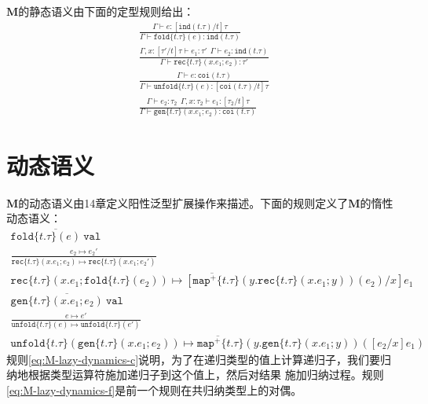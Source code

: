 $\textbf{M}$的静态语义由下面的定型规则给出：
\begin{subequations}\label{eq:M-lazy-statics}
	\begin{gather}
	\frac{\Gamma\vdash e:[\texttt{ind}(t.\tau)/t]\tau}{\Gamma\vdash\texttt{fold}\{t.\tau\}(e):\texttt{ind}(t.\tau)} \\
	\frac{\Gamma,x:[\tau'/t]\tau\vdash e_1:\tau'\ \ \Gamma\vdash e_2:\texttt{ind}(t.\tau)}
	{\Gamma\vdash\texttt{rec}\{t.\tau\}(x.e_1;e_2):\tau'} \\
	\frac{\Gamma\vdash e:\texttt{coi}(t.\tau)}{\Gamma\vdash\texttt{unfold}\{t.\tau\}(e):[\texttt{coi}(t.\tau)/t]\tau} \\
	\frac{\Gamma\vdash e_2:\tau_2\ \ \Gamma,x:\tau_2\vdash e_1:[\tau_2/t]\tau}
	{\Gamma\vdash\texttt{gen}\{t.\tau\}(x.e_1;e_2):\texttt{coi}(t.\tau)}
	\end{gather}
\end{subequations}

\section{动态语义}

$\textbf{M}$的动态语义由14章定义阳性泛型扩展操作来描述。下面的规则定义了$\textbf{M}$的惰性动态语义：
\begin{subequations} \label{eq:M-lazy-dynamics}
	\begin{gather}
	\overline{\texttt{fold}\{t.\tau\}(e)\ \texttt{val}}\label{eq:M-lazy-dynamics-a} \\
	\frac{e_2\mapsto e_2'}{\texttt{rec}\{t.\tau\}(x.e_1;e_2)\mapsto\texttt{rec}\{t.\tau\}(x.e_1;e_2')}\label{eq:M-lazy-dynamics-b} \\
	\overline{\texttt{rec}\{t.\tau\}(x.e_1;\texttt{fold}\{t.\tau\}(e_2))\mapsto
	[\texttt{map}^+\{t.\tau\}(y.\texttt{rec}\{t.\tau\}(x.e_1;y))(e_2)/x]e_1}\label{eq:M-lazy-dynamics-c} \\
	\overline{\texttt{gen}\{t.\tau\}(x.e_1;e_2)\ \texttt{val}}\label{eq:M-lazy-dynamics-d} \\
	\frac{e\mapsto e'}{\texttt{unfold}\{t.\tau\}(e)\mapsto\texttt{unfold}\{t.\tau\}(e')}\label{eq:M-lazy-dynamics-e} \\
	\overline{\texttt{unfold}\{t.\tau\}(\texttt{gen}\{t.\tau\}(x.e_1;e_2))\mapsto
	\texttt{map}^+\{t.\tau\}(y.\texttt{gen}\{t.\tau\}(x.e_1;y))([e_2/x]e_1)} \label{eq:M-lazy-dynamics-f}
	\end{gather}
\end{subequations}
规则\ref{eq:M-lazy-dynamics-c}说明，为了在递归类型的值上计算递归子，我们要归纳地根据类型运算符施加递归子到这个值上，然后对结果
施加归纳过程。规则\ref{eq:M-lazy-dynamics-f}是前一个规则在共归纳类型上的对偶。

